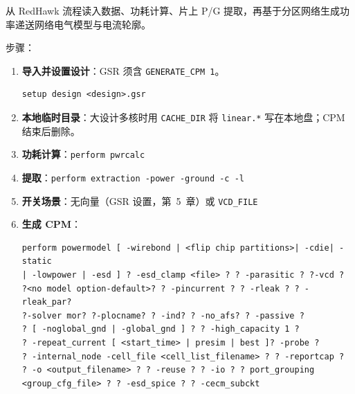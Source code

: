 从 RedHawk 流程读入数据、功耗计算、片上 P/G 提取，再基于分区网络生成功率递送网络电气模型与电流轮廓。

步骤：
\begin{enumerate}
  \item \textbf{导入并设置设计}：GSR 须含 \texttt{GENERATE\_CPM 1}。
\begin{lstlisting}
setup design <design>.gsr
\end{lstlisting}
  \item \textbf{本地临时目录}：大设计多核时用 \texttt{CACHE\_DIR} 将 \texttt{linear.*} 写在本地盘；CPM 结束后删除。
  \item \textbf{功耗计算}：\texttt{perform pwrcalc}
  \item \textbf{提取}：\texttt{perform extraction -power -ground -c -l}
  \item \textbf{开关场景}：无向量（GSR 设置，第~5~章）或 \texttt{VCD\_FILE}
  \item \textbf{生成 CPM}：
\begin{lstlisting}
perform powermodel [ -wirebond | <flip chip partitions>| -cdie| -static
| -lowpower | -esd ] ? -esd_clamp <file> ? ? -parasitic ? ?-vcd ?
?<no model option-default>? ? -pincurrent ? ? -rleak ? ? -rleak_par?
?-solver mor? ?-plocname? ? -ind? ? -no_afs? ? -passive ?
? [ -noglobal_gnd | -global_gnd ] ? ? -high_capacity 1 ?
? -repeat_current [ <start_time> | presim | best ]? -probe ?
? -internal_node -cell_file <cell_list_filename> ? ? -reportcap ?
? -o <output_filename> ? ? -reuse ? ? -io ? ? port_grouping
<group_cfg_file> ? ? -esd_spice ? ? -cecm_subckt
\end{lstlisting}
\end{enumerate}

